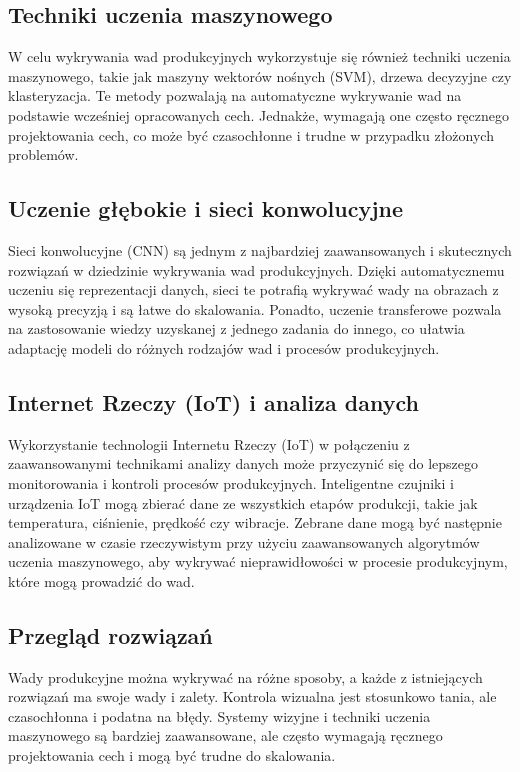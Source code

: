 \subsection{Techniki uczenia maszynowego}
W celu wykrywania wad produkcyjnych wykorzystuje się również techniki uczenia maszynowego, takie jak maszyny wektorów nośnych (SVM), drzewa decyzyjne czy klasteryzacja. Te metody pozwalają na automatyczne wykrywanie wad na podstawie wcześniej opracowanych cech. Jednakże, wymagają one często ręcznego projektowania cech, co może być czasochłonne i trudne w przypadku złożonych problemów.

\subsection{Uczenie głębokie i sieci konwolucyjne}
Sieci konwolucyjne (CNN) są jednym z najbardziej zaawansowanych i skutecznych rozwiązań w dziedzinie wykrywania wad produkcyjnych. Dzięki automatycznemu uczeniu się reprezentacji danych, sieci te potrafią wykrywać wady na obrazach z wysoką precyzją i są łatwe do skalowania. Ponadto, uczenie transferowe pozwala na zastosowanie wiedzy uzyskanej z jednego zadania do innego, co ułatwia adaptację modeli do różnych rodzajów wad i procesów produkcyjnych.

\subsection{Internet Rzeczy (IoT) i analiza danych}
Wykorzystanie technologii Internetu Rzeczy (IoT) w połączeniu z zaawansowanymi technikami analizy danych może przyczynić się do lepszego monitorowania i kontroli procesów produkcyjnych. Inteligentne czujniki i urządzenia IoT mogą zbierać dane ze wszystkich etapów produkcji, takie jak temperatura, ciśnienie, prędkość czy wibracje. Zebrane dane mogą być następnie analizowane w czasie rzeczywistym przy użyciu zaawansowanych algorytmów uczenia maszynowego, aby wykrywać nieprawidłowości w procesie produkcyjnym, które mogą prowadzić do wad.

\subsection{Przegląd rozwiązań}

Wady produkcyjne można wykrywać na różne sposoby, a każde z istniejących rozwiązań ma swoje wady i zalety. Kontrola wizualna jest stosunkowo tania, ale czasochłonna i podatna na błędy. Systemy wizyjne i techniki uczenia maszynowego są bardziej zaawansowane, ale często wymagają ręcznego projektowania cech i mogą być trudne do skalowania.

